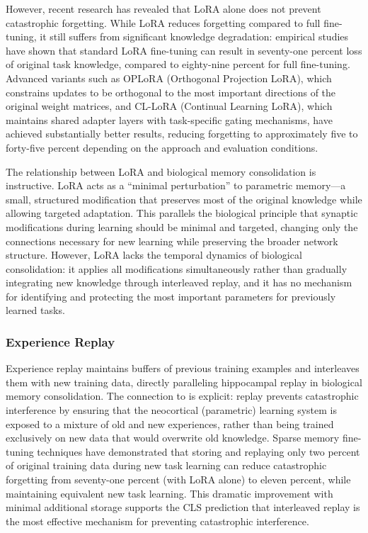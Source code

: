 However, recent research has revealed that LoRA alone does not prevent catastrophic forgetting. While LoRA reduces forgetting compared to full fine-tuning, it still suffers from significant knowledge degradation: empirical studies have shown that standard LoRA fine-tuning can result in seventy-one percent loss of original task knowledge, compared to eighty-nine percent for full fine-tuning. Advanced variants such as OPLoRA (Orthogonal Projection LoRA), which constrains updates to be orthogonal to the most important directions of the original weight matrices, and CL-LoRA (Continual Learning LoRA), which maintains shared adapter layers with task-specific gating mechanisms, have achieved substantially better results, reducing forgetting to approximately five to forty-five percent depending on the approach and evaluation conditions.

The relationship between LoRA and biological memory consolidation is instructive. LoRA acts as a ``minimal perturbation'' to parametric memory---a small, structured modification that preserves most of the original knowledge while allowing targeted adaptation. This parallels the biological principle that synaptic modifications during learning should be minimal and targeted, changing only the connections necessary for new learning while preserving the broader network structure. However, LoRA lacks the temporal dynamics of biological consolidation: it applies all modifications simultaneously rather than gradually integrating new knowledge through interleaved replay, and it has no mechanism for identifying and protecting the most important parameters for previously learned tasks.

\subsubsection{Experience Replay}

Experience replay maintains buffers of previous training examples and interleaves them with new training data, directly paralleling hippocampal replay in biological memory consolidation. The connection to \citet{mcclelland1995complementary} is explicit: replay prevents catastrophic interference by ensuring that the neocortical (parametric) learning system is exposed to a mixture of old and new experiences, rather than being trained exclusively on new data that would overwrite old knowledge. Sparse memory fine-tuning techniques have demonstrated that storing and replaying only two percent of original training data during new task learning can reduce catastrophic forgetting from seventy-one percent (with LoRA alone) to eleven percent, while maintaining equivalent new task learning. This dramatic improvement with minimal additional storage supports the CLS prediction that interleaved replay is the most effective mechanism for preventing catastrophic interference.

